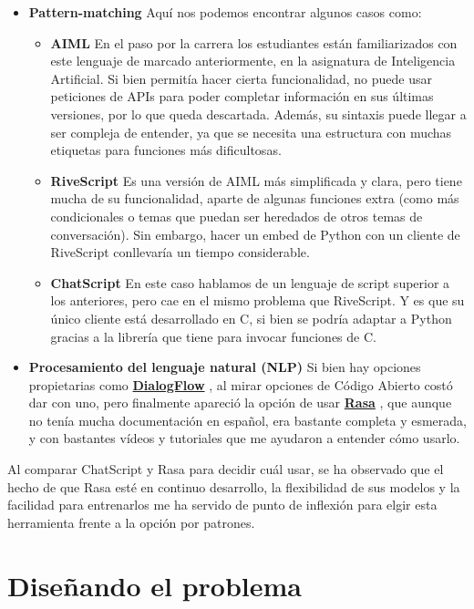 \begin{itemize}
	\item \textbf{Pattern-matching}
	Aquí nos podemos encontrar algunos casos como:
	\begin{itemize}
		\item \textbf{AIML} \cite{aiml} En el paso por la carrera los estudiantes están familiarizados con este lenguaje de marcado anteriormente, en la asignatura de Inteligencia Artificial. Si bien permitía hacer cierta funcionalidad, no puede usar peticiones de APIs para poder completar información en sus últimas versiones, por lo que queda descartada. Además, su sintaxis puede llegar a ser compleja de entender, ya que se necesita una estructura con muchas etiquetas para funciones más dificultosas.
		\item \textbf{RiveScript} \cite{rivescript} Es una versión de AIML más simplificada y clara, pero tiene mucha de su funcionalidad, aparte de algunas funciones extra (como más condicionales o temas que puedan ser heredados de otros temas de conversación). Sin embargo, hacer un embed de Python con un cliente de RiveScript conllevaría un tiempo considerable.
		\item \textbf{ChatScript} \cite{chatscript} En este caso hablamos de un lenguaje de script superior a los anteriores, pero cae en el mismo problema que RiveScript. Y es que su único cliente está desarrollado en C, si bien se podría adaptar a Python gracias a la librería que tiene para invocar funciones de C.
	\end{itemize}	
	\item \textbf{Procesamiento del lenguaje natural (NLP)}
	Si bien hay opciones propietarias como \textbf{\underline{DialogFlow}} \cite{dialogflow}, al mirar opciones de Código Abierto costó dar con uno, pero finalmente apareció la opción de usar \textbf{\underline{Rasa}} \cite{rasa}, que aunque no tenía mucha documentación en español, era bastante completa y esmerada, y con bastantes vídeos y tutoriales que me ayudaron a entender cómo usarlo.
\end{itemize}

Al comparar ChatScript y Rasa para decidir cuál usar, se ha observado que el hecho de que Rasa esté en continuo desarrollo, la flexibilidad de sus modelos y la facilidad para entrenarlos me ha servido de punto de inflexión para elgir esta herramienta frente a la opción por patrones.
	
\section{Diseñando el problema}

